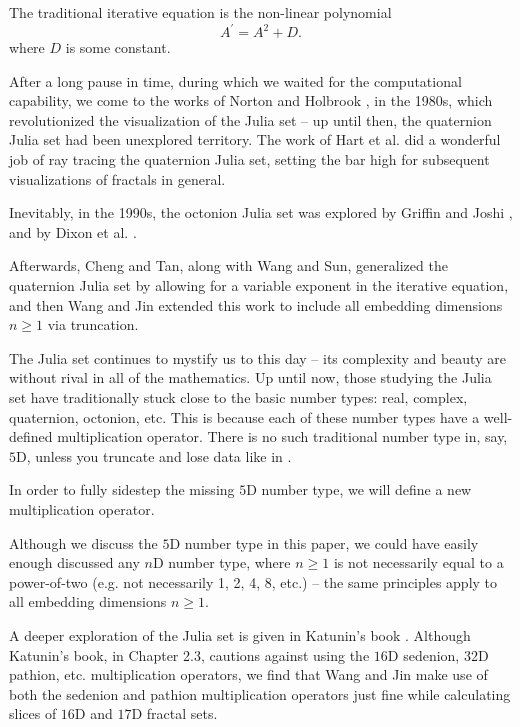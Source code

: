 \documentclass[12pt]{article}
\begin{document}
The traditional iterative equation is the non-linear polynomial
\begin{equation}
A^{\prime} = A^2 + D.
\end{equation}
where $D$ is some constant.

After a long pause in time, during which we waited for the computational capability, we come to the works of Norton and Holbrook \cite{norton, holbrook}, in the 1980s, which revolutionized the visualization of the Julia set -- up until then, the quaternion Julia set had been unexplored territory.
The work of Hart et al. \cite{hart} did a wonderful job of ray tracing the quaternion Julia set, setting the bar high for subsequent visualizations of fractals in general.

Inevitably, in the 1990s, the octonion Julia set was explored by Griffin and Joshi \cite{griffin}, and by Dixon et al. \cite{dixon}.

Afterwards, Cheng and Tan, along with Wang and Sun, generalized the quaternion Julia set \cite{cheng, wang} by allowing for a variable exponent in the iterative equation, and then Wang and Jin extended this work \cite{wang2} to include all embedding dimensions $n \geq 1$ via truncation.

The Julia set continues to mystify us to this day -- its complexity and beauty are without rival in all of the mathematics.
Up until now, those studying the Julia set have traditionally stuck close to the basic number types: real, complex, quaternion, octonion, etc.
This is because each of these number types have a well-defined multiplication operator.
There is no such traditional number type in, say, $5$D, unless you truncate and lose data like in \cite{wang2}.

In order to fully sidestep the missing $5$D number type, we will define a new multiplication operator.

Although we discuss the $5$D number type in this paper, we could have easily enough discussed any $n$D number type, where $n \geq 1$ is not necessarily equal to a power-of-two (e.g. not necessarily 1, 2, 4, 8, etc.) -- the same principles apply to all embedding dimensions $n \geq 1$. 

A deeper exploration of the Julia set is given in Katunin's book \cite{katunin}.
Although Katunin's book, in Chapter 2.3, cautions against using the $16$D sedenion, $32$D pathion, etc. multiplication operators, we find that Wang and Jin \cite{wang2} make use of both the sedenion and pathion multiplication operators just fine while calculating slices of $16$D and $17$D fractal sets.
\end{document}
